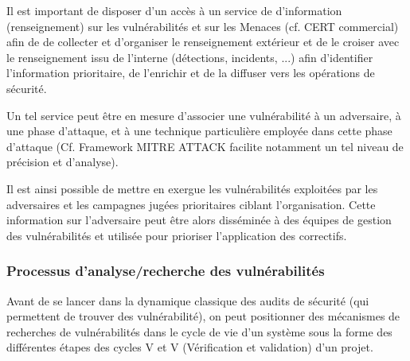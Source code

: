 Il est important de disposer d'un accès à un service  de d'information (renseignement) sur les vulnérabilités et sur les Menaces (cf. CERT commercial) afin de de collecter et d’organiser le renseignement extérieur et de le croiser avec le renseignement issu de l’interne (détections, incidents, ...) afin d’identifier l'information prioritaire, de l’enrichir et de la diffuser vers les opérations de sécurité. 
 
Un tel service peut être en mesure d’associer une vulnérabilité à un adversaire, à une phase d’attaque, et à une technique particulière employée dans cette phase d’attaque (Cf. Framework MITRE ATTACK facilite notamment un tel niveau de précision et d’analyse).


Il est ainsi possible de mettre en exergue les vulnérabilités exploitées par les adversaires et les campagnes jugées prioritaires  ciblant l’organisation. Cette information sur l’adversaire peut être alors disséminée à des équipes de gestion des vulnérabilités et utilisée pour prioriser l’application des correctifs.



\subsubsection{Processus d’analyse/recherche des vulnérabilités}

Avant de se lancer dans la dynamique classique des audits de sécurité (qui permettent de trouver des vulnérabilité), on peut positionner des mécanismes de recherches de vulnérabilités dans le cycle de vie d'un système sous la forme des différentes étapes des cycles V et V (Vérification et validation) d'un projet.


